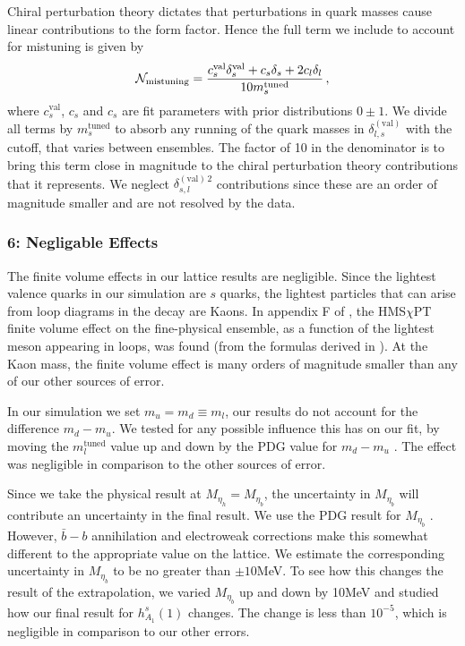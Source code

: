 Chiral perturbation theory dictates that perturbations in quark masses cause linear contributions to the form factor. Hence the full term we include to account for mistuning is given by
\begin{align}
  \mathcal{N}_{\text{mistuning}} = {c^{\text{val}}_s \delta^{\text{val}}_s + c_s \delta_s + 2 c_l \delta_l \over 10 m_s^{\text{tuned}}}\,,
  \label{eq:mistuning_BsDsstar}
\end{align}
where $c_s^{\text{val}}$, $c_s$ and $c_s$ are fit parameters with prior distributions $0\pm 1$. We divide all terms by $m_s^{\text{tuned}}$ to absorb any running of the quark masses in $\delta_{l,s}^{(\text{val})}$ with the cutoff, that varies between ensembles. The factor of 10 in the denominator is to bring this term close in magnitude to the chiral perturbation theory contributions that it represents. We neglect $\delta^{(\text{val})\,2}_{s,l}$ contributions since these are an order of magnitude smaller and are not resolved by the data.

\subsubsection{6: Negligable Effects}

The finite volume effects in our lattice results are negligible. Since the lightest valence quarks in our simulation are $s$ quarks, the lightest particles that can arise from loop diagrams in the decay are Kaons. In appendix F of \cite{Harrison:2017fmw}, the HMS$\chi$PT finite volume effect on the fine-physical ensemble, as a function of the lightest meson appearing in loops, was found (from the formulas derived in \cite{Laiho:2005ue}). At the Kaon mass, the finite volume effect is many orders of magnitude smaller than any of our other sources of error. 

In our simulation we set $m_u=m_d\equiv m_l$, our results do not account for the difference $m_d-m_u$. We tested for any possible influence this has on our fit, by moving the $m_l^{\text{tuned}}$ value up and down by the PDG value for $m_d-m_u$ \cite{PhysRevD.98.030001}. The effect was negligible in comparison to the other sources of error.

Since we take the physical result at $M_{\eta_h}=M_{\eta_b}$, the uncertainty in $M_{\eta_b}$ will contribute an uncertainty in the final result. We use the PDG result for $M_{\eta_b}$ \cite{PhysRevD.98.030001}. However, $\bar{b}-b$ annihilation and electroweak corrections make this somewhat different to the appropriate value on the lattice. We estimate the corresponding uncertainty in $M_{\eta_b}$ to be no greater than $\pm10$MeV. To see how this changes the result of the extrapolation, we varied $M_{\eta_b}$ up and down by 10MeV and studied how our final result for $h_{A_1}^s(1)$ changes. The change is less than $10^{-5}$, which is negligible in comparison to our other errors.

